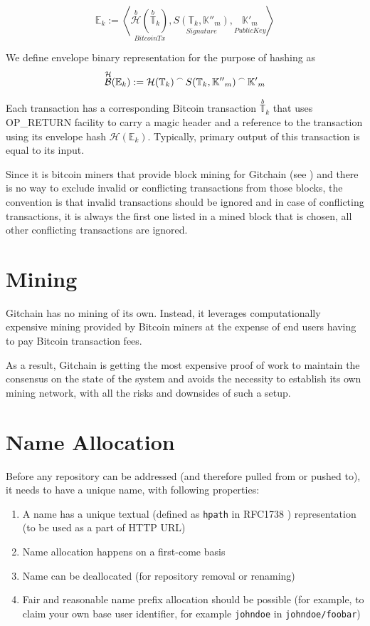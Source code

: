 \documentclass[a4paper]{article}
\newcommand{\concatA}{%
  \mathbin{\raisebox{1ex}{\scalebox{.7}{$\frown$}}}%
}
\newcommand{\Gbinhash}{\overset{\mathcal{H}}{\mathcal{B}}}
\newcommand{\Ghash}{\mathcal{H}}
\newcommand{\Gbitcoinhash}{\overset{b}{\mathcal{H}}}
\newcommand{\Gtxs}{\mathbb{T}}
\newcommand{\Gbitcointxs}{\overset{b}{\mathbb{T}}}
\newcommand{\Genvs}{\mathbb{E}}
\newcommand{\Gpubkeys}{\mathbb{K}{'}}
\newcommand{\Gprivkeys}{\mathbb{K}{''}}
\newcommand{\tuple}[1]{\ensuremath{\left \langle #1 \right \rangle }}
\begin{document}
$$
\Genvs_{k} := \tuple{\underset{BitcoinTx}{\Gbitcoinhash(\Gbitcointxs_{k})}, \underset{Signature}{S(\Gtxs_{k}, \Gprivkeys_{m})}, \underset{PublicKey}{\Gpubkeys_{m}}}
$$

We define envelope binary representation for the purpose of hashing as $$\Gbinhash(\Genvs_{k}) := \Ghash(\Gtxs_{k}) \concatA S(\Gtxs_{k}, \Gprivkeys_{m}) \concatA  \Gpubkeys_{m}$$

Each transaction has a corresponding Bitcoin transaction $\Gbitcointxs_{k}$ that uses \\OP\_RETURN facility to carry a magic header and a
reference to the transaction using its envelope hash $\Ghash(\Genvs_{k})$. Typically, primary output of this transaction is equal to its input.

Since it is bitcoin miners that provide block mining for Gitchain (see ) and there is no way to exclude invalid or
conflicting transactions from those blocks, the convention is that invalid transactions should be ignored and in case of conflicting
transactions, it is always the first one listed in a mined block that is chosen, all other conflicting transactions are ignored.

\section{Mining}
\label{sec:mining}

Gitchain has no mining of its own. Instead, it leverages computationally expensive mining provided by Bitcoin miners at the expense of end users having to pay Bitcoin transaction fees.

As a result, Gitchain is getting the most expensive proof of work to maintain the consensus on the state of the system and avoids the necessity to establish its own mining network, with all the risks and downsides of such a setup.


\section{Name Allocation}

Before any repository can be addressed (and therefore pulled from or pushed to), it needs to have a unique name, with following properties:

\begin{enumerate}
\item A name has a unique textual (defined as \texttt{hpath} in RFC1738 \cite{rfc1738}) representation (to be used as a part of HTTP URL)
\item Name allocation happens on a first-come basis
\item Name can be deallocated (for repository removal or renaming)
\item Fair and reasonable name prefix allocation should be possible (for example, to claim your own base user identifier, for example \texttt{johndoe} in \texttt{johndoe/foobar})
\end{enumerate}
\end{document}
